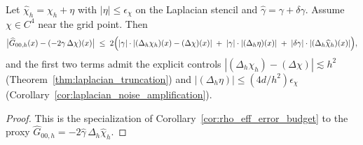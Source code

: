 \begin{corollary}
\label{cor:discrete_G00_error_budget}
\MathTag Let $\widehat\chi_h=\chi_h+\eta$ with $|\eta|\le \epsilon_\chi$ on the Laplacian stencil and $\widehat\gamma=\gamma+\delta\gamma$.
Assume $\chi\in C^4$ near the grid point.
Then
\begin{equation}
\label{eq:discrete_G00_error_budget}
\bigl|\widehat G_{00,h}(x)-(-2\gamma\,\Delta\chi)(x)\bigr|
\;\le\;
2\Bigl(
|\gamma|\cdot|(\Delta_h\chi_h)(x)-(\Delta\chi)(x)|
\;+\;|\gamma|\cdot|(\Delta_h\eta)(x)|
\;+\;|\delta\gamma|\cdot|(\Delta_h\widehat\chi_h)(x)|
\Bigr),
\end{equation}
and the first two terms admit the explicit controls
$|(\Delta_h\chi_h)-(\Delta\chi)|\lesssim h^2$ (Theorem~\ref{thm:laplacian_truncation})
and $|(\Delta_h\eta)|\le (4d/h^2)\epsilon_\chi$ (Corollary~\ref{cor:laplacian_noise_amplification}).
\end{corollary}

\begin{proof}
This is the specialization of Corollary~\ref{cor:rho_eff_error_budget} to the proxy $\widehat G_{00,h}=-2\widehat\gamma\,\Delta_h\widehat\chi_h$.
\end{proof}


